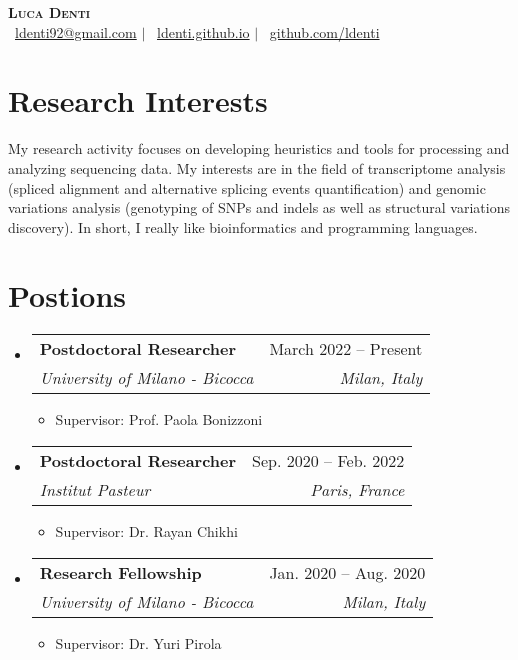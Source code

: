 \documentclass[letterpaper,11pt]{article}
\makeatletter
\newcommand{\resumeItem}[1]{
  \item\small{
    {#1 \vspace{-2pt}}
  }
}
\newcommand{\resumeSubheading}[4]{
  \vspace{-2pt}\item
    \begin{tabular*}{0.97\textwidth}[t]{l@{\extracolsep{\fill}}r}
      \textbf{#1} & #2 \\
      \textit{\small#3} & \textit{\small #4} \\
    \end{tabular*}\vspace{-7pt}
}
\newcommand{\resumeSubHeadingListStart}{\begin{itemize}[leftmargin=0.15in, label={}]}
\newcommand{\resumeSubHeadingListEnd}{\end{itemize}}
\newcommand{\resumeItemListStart}{\begin{itemize}}
\newcommand{\resumeItemListEnd}{\end{itemize}\vspace{-5pt}}
\makeatother
\begin{document}
\begin{center}
    \textbf{\Huge \scshape Luca Denti} \\ \vspace{1pt}
    \Letter~\href{mailto:ldenti92@gmail.com}{ldenti92@gmail.com} $|$
    \faHome~\href{https://ldenti.github.io}{ldenti.github.io} $|$
    \faGithub~\href{https://github.com/ldenti}{github.com/ldenti}
\end{center}

\section{Research Interests}
My research activity focuses on developing heuristics and tools for processing and analyzing sequencing data. My interests are in the field of transcriptome analysis (spliced alignment and alternative splicing events quantification) and genomic variations analysis (genotyping of SNPs and indels as well as structural variations discovery). In short, I really like bioinformatics and programming languages.

\section{Postions}
  \resumeSubHeadingListStart
    \resumeSubheading
      {Postdoctoral Researcher}{March 2022 -- Present}
      {University of Milano - Bicocca}{Milan, Italy}
      \resumeItemListStart
        \resumeItem{Supervisor: Prof. Paola Bonizzoni}
      \resumeItemListEnd
    \resumeSubheading
      {Postdoctoral Researcher}{Sep. 2020 -- Feb. 2022}
      {Institut Pasteur}{Paris, France}
      \resumeItemListStart
        \resumeItem{Supervisor: Dr. Rayan Chikhi}
      \resumeItemListEnd
    \resumeSubheading
      {Research Fellowship}{Jan. 2020 -- Aug. 2020}
      {University of Milano - Bicocca}{Milan, Italy}
      \resumeItemListStart
        \resumeItem{Supervisor: Dr. Yuri Pirola}
      \resumeItemListEnd
  \resumeSubHeadingListEnd
\end{document}
